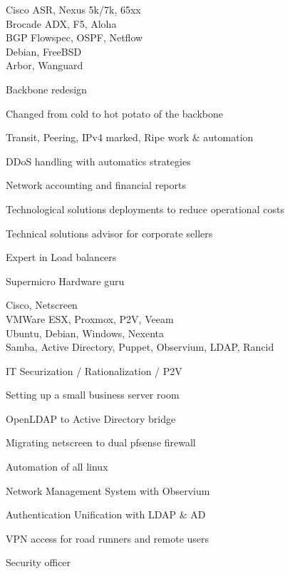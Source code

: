\documentclass[a4paper,11pt]{cv4tw}%
\begin{document}
	{Cisco ASR, Nexus 5k/7k, 65xx\\Brocade ADX, F5, Aloha\\BGP Flowspec, OSPF, Netflow\\Debian, FreeBSD\\Arbor, Wanguard}
		{ Backbone redesign
		\begin{missions}
			\item Changed from cold to hot potato of the backbone
			\item Transit, Peering, IPv4 marked, Ripe work \& automation
			\item DDoS handling with automatics strategies
			\item Network accounting and financial reports
			\item Technological solutions deployments to reduce operational costs
			\item Technical solutions advisor for corporate sellers
			\item Expert in Load balancers
			\item Supermicro Hardware guru
		\end{missions}
	}

	{Cisco, Netscreen\\VMWare ESX, Proxmox, P2V, Veeam\\Ubuntu, Debian, Windows, Nexenta\\Samba, Active Directory, Puppet, Observium, LDAP, Rancid}
		{ IT Securization / Rationalization / P2V 
		\begin{missions}
			\item Setting up a small business server room
			\item OpenLDAP to Active Directory bridge
			\item Migrating netscreen to dual pfsense firewall
			\item Automation of all linux
			\item Network Management System with Observium
			\item Authentication Unification with LDAP \& AD
			\item VPN access for road runners and remote users
			\item Security officer
		\end{missions}
	}
\end{document}
